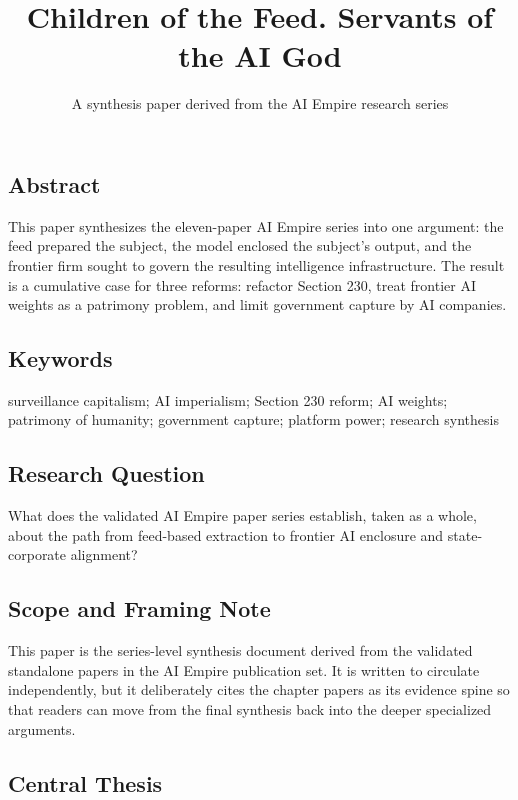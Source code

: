 \documentclass[
  american,
  11pt,
  letterpaper,
]{article}
\title{Children of the Feed. Servants of the AI God}
\subtitle{A synthesis paper derived from the AI Empire research series}
\author{}
\date{}
\begin{document}
\maketitle

\subsection{Abstract}\label{abstract}

This paper synthesizes the eleven-paper AI Empire series into one
argument: the feed prepared the subject, the model enclosed the
subject's output, and the frontier firm sought to govern the resulting
intelligence infrastructure. The result is a cumulative case for three
reforms: refactor Section 230, treat frontier AI weights as a patrimony
problem, and limit government capture by AI companies.

\subsection{Keywords}\label{keywords}

surveillance capitalism; AI imperialism; Section 230 reform; AI weights;
patrimony of humanity; government capture; platform power; research
synthesis

\subsection{Research Question}\label{research-question}

What does the validated AI Empire paper series establish, taken as a
whole, about the path from feed-based extraction to frontier AI
enclosure and state-corporate alignment?

\subsection{Scope and Framing Note}\label{scope-and-framing-note}

This paper is the series-level synthesis document derived from the
validated standalone papers in the AI Empire publication set. It is
written to circulate independently, but it deliberately cites the
chapter papers as its evidence spine so that readers can move from the
final synthesis back into the deeper specialized arguments.

\subsection{Central Thesis}\label{central-thesis}
\end{document}
